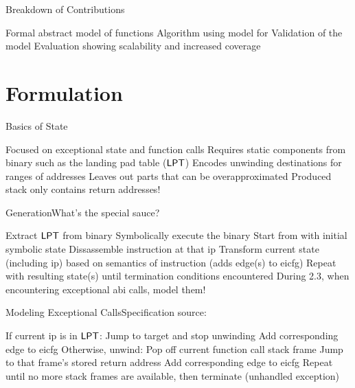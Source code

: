 \begin{frame}{Breakdown of Contributions}
  \begin{outline}[enumerate] %
    \1<+-> \alert{Formal abstract model} of   functions
    \1<+-> \alert{Algorithm} using model for 
    \1<+-> \alert{Validation} of the model
    \1<+-> \alert{Evaluation} showing scalability and increased coverage
  \end{outline}
\end{frame}

\section{Formulation}
\begin{frame}{Basics of State}
  \begin{outline}
    \1 Focused on \alert{exceptional state} and \alert{function calls}
    \1 Requires static components from binary such as the \alert{landing pad table ($\operatorname{\mathsf{LPT}}$)}
    \2 Encodes unwinding destinations for ranges of addresses
    \1 Leaves out parts that can be overapproximated
    \2 Produced stack only contains return addresses!
  \end{outline}
\end{frame}

\begin{frame}{Generation}{What's the special sauce?}
  \begin{outline}[enumerate]
    \1<+-> Extract $\operatorname{\mathsf{LPT}}$ from binary
    \1<+-> \alert{Symbolically execute} the binary
    \2<+-> Start from  with initial \alert{symbolic state}
    \2<+-> Dissassemble instruction at that \gls{ip}
    \2<+-> Transform current state (including \gls{ip}) based on semantics of instruction (adds edge(s) to \gls{eicfg})
    \2<+-> Repeat with resulting state(s) until termination conditions encountered
    \1<+-> \alert{During 2.3, when encountering exceptional \gls{abi} calls, model them!}
  \end{outline}
\end{frame}

\begin{frame}{Modeling Exceptional  Calls}{Specification source: }
  \begin{block}{}
    \begin{outline}[enumerate]
      \1<+-> If current \gls{ip} is in $\operatorname{\mathsf{LPT}}$:
      \2<+-> Jump to target and stop unwinding
      \2<+-> Add corresponding edge to \gls{eicfg}
      \1<+-> Otherwise, unwind:
      \2<+-> Pop off current function call stack frame
      \2<+-> Jump to that frame's stored return address
      \2<+-> Add corresponding edge to \gls{eicfg}
      \1<+-> Repeat until no more stack frames are available, then terminate (\alert{unhandled exception})
    \end{outline}
  \end{block}
\end{frame}

